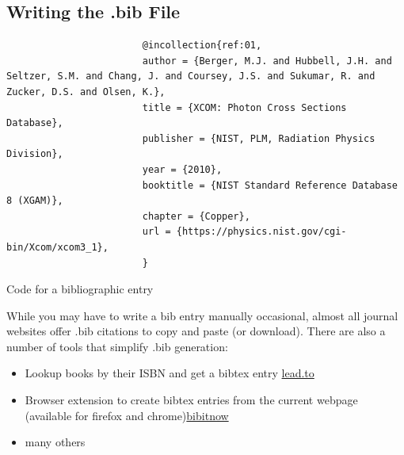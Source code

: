 \documentclass[titlepage, hidelinks, 12pt]{article}%
\begin{document}
        \subsection{Writing the .bib File}
            \begin{listing}[H]
                \begin{centering}
                    \begin{verbatim}
                        @incollection{ref:01,
                        author = {Berger, M.J. and Hubbell, J.H. and Seltzer, S.M. and Chang, J. and Coursey, J.S. and Sukumar, R. and Zucker, D.S. and Olsen, K.},
                        title = {XCOM: Photon Cross Sections Database},
                        publisher = {NIST, PLM, Radiation Physics Division},
                        year = {2010},
                        booktitle = {NIST Standard Reference Database 8 (XGAM)},
                        chapter = {Copper},
                        url = {https://physics.nist.gov/cgi-bin/Xcom/xcom3_1},
                        }
                    \end{verbatim}
                    \caption{Code for a bibliographic entry}
                    \label{lst:bibliography}
                \end{centering}
            \end{listing}
            While you may have to write a bib entry manually occasional, almost all journal websites offer .bib citations to copy and paste (or download).
            There are also a number of tools that simplify .bib generation:
            \begin{itemize}
                \item Lookup books by their ISBN and get a bibtex entry \href{https://lead.to/amazon/com/?key=+&si=all&op=bt&bn=&so=sa&ht=us}{lead.to}
                \item Browser extension to create bibtex entries from the current webpage (available for firefox and chrome)\href{https://github.com/Langenscheiss/bibitnow}{bibitnow}
                \item many others
            \end{itemize}
\end{document}
